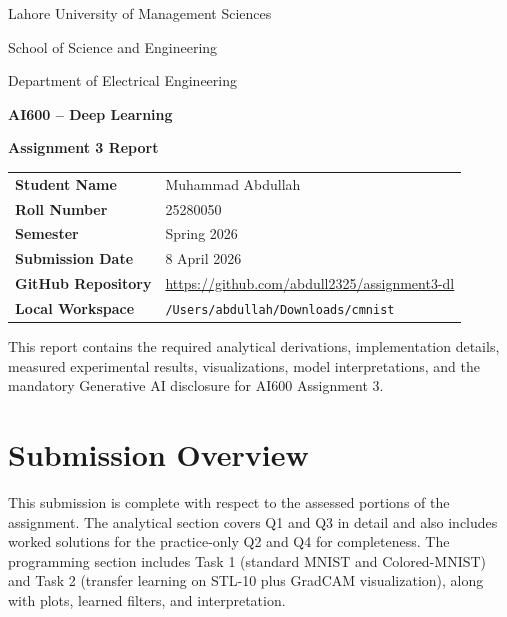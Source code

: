 \documentclass[11pt]{article}
\newcommand{\StudentName}{Muhammad Abdullah}
\newcommand{\RollNumber}{25280050}
\newcommand{\RepoURL}{https://github.com/abdull2325/assignment3-dl}
\newcommand{\SubmissionDate}{8 April 2026}
\begin{document}
\begin{titlepage}
  \centering
  {\large Lahore University of Management Sciences\par}
  {\large School of Science and Engineering\par}
  {\large Department of Electrical Engineering\par}
  \vspace{1.4cm}
  {\huge \textbf{AI600 -- Deep Learning}\par}
  \vspace{0.25cm}
  {\LARGE \textbf{Assignment 3 Report}\par}
  \vspace{1.4cm}

  \begin{tabular}{>{\bfseries}p{}p{}}
    Student Name & \StudentName \\
    Roll Number & \RollNumber \\
    Semester & Spring 2026 \\
    Submission Date & \SubmissionDate \\
    GitHub Repository & \href{\RepoURL}{\RepoURL} \\
    Local Workspace & \texttt{/Users/abdullah/Downloads/cmnist} \\
  \end{tabular}

  \vfill

  \begin{minipage}{0.9\textwidth}
    \small
    This report contains the required analytical derivations, implementation details,
    measured experimental results, visualizations, model interpretations, and the
    mandatory Generative AI disclosure for AI600 Assignment 3.
  \end{minipage}
\end{titlepage}

\tableofcontents
\newpage
\listoffigures
\newpage
{}

\section{Submission Overview}

This submission is complete with respect to the assessed portions of the assignment. The
analytical section covers Q1 and Q3 in detail and also includes worked solutions for the
practice-only Q2 and Q4 for completeness. The programming section includes Task 1
(standard MNIST and Colored-MNIST) and Task 2 (transfer learning on STL-10 plus GradCAM
visualization), along with plots, learned filters, and interpretation.
\end{document}
